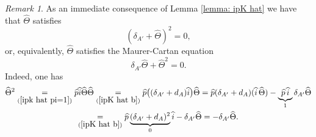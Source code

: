 \documentclass[11pt,a4paper]{amsart}
\theoremstyle{plain} %
\theoremstyle{definition}
\theoremstyle{remark}
\newtheorem{rem}[thm]{Remark}
\newcommand{\wh}{\widehat}
\newcommand{\ad}{\mathrm{ad}}
\begin{document}
{

\begin{rem}\label{rem: Thetahat squared}
    As an immediate consequence of Lemma \ref{lemma: ipK hat} we have that $\wh\Theta$ satisfies 
    \begin{equation}
        (\delta_{A'}+\wh\Theta)^2=0,
    \end{equation}
or, equivalently, $\wh\Theta$ satisfies the Maurer-Cartan equation 
\begin{equation}\label{Theta MC}
\delta_{A'}\wh\Theta+\wh\Theta^2=0.
\end{equation}
Indeed, one has
\begin{multline*} 
\wh\Theta^2\underset{(\ref{ipk hat pi=1})}{=}\wh{p}\wh{i}\wh\Theta\wh\Theta\underset{(\ref{ipK hat b})}{=}\wh{p} \big((\delta_{A'}+d_A)\wh{i}\big)\wh\Theta=
\wh{p} (\delta_{A'}+d_A)(\wh{i}\,\wh\Theta)-\underbrace{\wh{p}\,\wh{i}}_1\delta_{A'}\wh\Theta\\
\underset{(\ref{ipK hat b})}{=} 
\wh{p}\underbrace{(\delta_{A'}+d_A)^2}_0\wh{i}-\delta_{A'}\wh\Theta=-\delta_{A'}\wh\Theta.
\end{multline*}
\end{rem}

}
\end{document}
